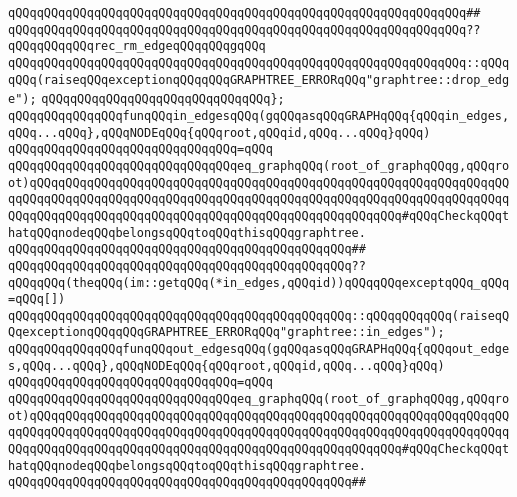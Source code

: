 \verb|qQQqqQQqqQQqqQQqqQQqqQQqqQQqqQQqqQQqqQQqqQQqqQQqqQQqqQQqqQQqqQQq##|\newline
\verb|qQQqqQQqqQQqqQQqqQQqqQQqqQQqqQQqqQQqqQQqqQQqqQQqqQQqqQQqqQQqqQQq??qQQqqQQqqQQqrec_rm_edgeqQQqqQQqgqQQq|\newline
\verb|qQQqqQQqqQQqqQQqqQQqqQQqqQQqqQQqqQQqqQQqqQQqqQQqqQQqqQQqqQQqqQQq::qQQqqQQq(raiseqQQqexceptionqQQqqQQqGRAPHTREE_ERRORqQQq"graphtree::drop_edge");|\newline
\verb|qQQqqQQqqQQqqQQqqQQqqQQqqQQqqQQq};|\newline
\newline
\newline
\verb|qQQqqQQqqQQqqQQqfunqQQqin_edgesqQQq(gqQQqasqQQqGRAPHqQQq{qQQqin_edges,qQQq...qQQq},qQQqNODEqQQq{qQQqroot,qQQqid,qQQq...qQQq}qQQq)|\newline
\verb|qQQqqQQqqQQqqQQqqQQqqQQqqQQqqQQq=qQQq|\newline
\verb|qQQqqQQqqQQqqQQqqQQqqQQqqQQqqQQqeq_graphqQQq(root_of_graphqQQqg,qQQqroot)qQQqqQQqqQQqqQQqqQQqqQQqqQQqqQQqqQQqqQQqqQQqqQQqqQQqqQQqqQQqqQQqqQQqqQQqqQQqqQQqqQQqqQQqqQQqqQQqqQQqqQQqqQQqqQQqqQQqqQQqqQQqqQQqqQQqqQQqqQQqqQQqqQQqqQQqqQQqqQQqqQQqqQQqqQQqqQQqqQQqqQQqqQQqqQQq#qQQqCheckqQQqthatqQQqnodeqQQqbelongsqQQqtoqQQqthisqQQqgraphtree.|\newline
\verb|qQQqqQQqqQQqqQQqqQQqqQQqqQQqqQQqqQQqqQQqqQQqqQQq##|\newline
\verb|qQQqqQQqqQQqqQQqqQQqqQQqqQQqqQQqqQQqqQQqqQQqqQQq??qQQqqQQq(theqQQq(im::getqQQq(*in_edges,qQQqid))qQQqqQQqexceptqQQq_qQQq=qQQq[])|\newline
\verb|qQQqqQQqqQQqqQQqqQQqqQQqqQQqqQQqqQQqqQQqqQQqqQQq::qQQqqQQqqQQq(raiseqQQqexceptionqQQqqQQqGRAPHTREE_ERRORqQQq"graphtree::in_edges");|\newline
\newline
\verb|qQQqqQQqqQQqqQQqfunqQQqout_edgesqQQq(gqQQqasqQQqGRAPHqQQq{qQQqout_edges,qQQq...qQQq},qQQqNODEqQQq{qQQqroot,qQQqid,qQQq...qQQq}qQQq)|\newline
\verb|qQQqqQQqqQQqqQQqqQQqqQQqqQQqqQQq=qQQq|\newline
\verb|qQQqqQQqqQQqqQQqqQQqqQQqqQQqqQQqeq_graphqQQq(root_of_graphqQQqg,qQQqroot)qQQqqQQqqQQqqQQqqQQqqQQqqQQqqQQqqQQqqQQqqQQqqQQqqQQqqQQqqQQqqQQqqQQqqQQqqQQqqQQqqQQqqQQqqQQqqQQqqQQqqQQqqQQqqQQqqQQqqQQqqQQqqQQqqQQqqQQqqQQqqQQqqQQqqQQqqQQqqQQqqQQqqQQqqQQqqQQqqQQqqQQqqQQqqQQq#qQQqCheckqQQqthatqQQqnodeqQQqbelongsqQQqtoqQQqthisqQQqgraphtree.|\newline
\verb|qQQqqQQqqQQqqQQqqQQqqQQqqQQqqQQqqQQqqQQqqQQqqQQq##|\newline
